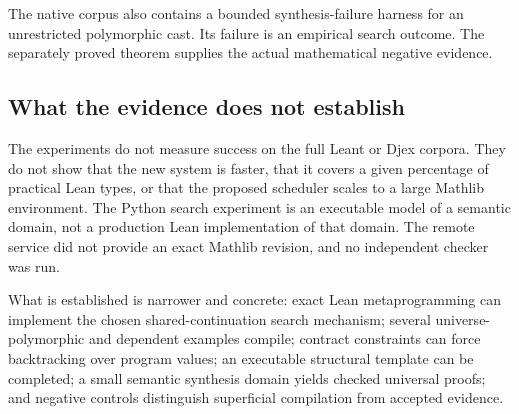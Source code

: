 The native corpus also contains a bounded synthesis-failure harness for an unrestricted polymorphic cast. Its failure is an empirical search outcome. The separately proved  theorem supplies the actual mathematical negative evidence.

\subsection{What the evidence does not establish}
The experiments do not measure success on the full Leant or Djex corpora. They do not show that the new system is faster, that it covers a given percentage of practical Lean types, or that the proposed scheduler scales to a large Mathlib environment. The Python search experiment is an executable model of a semantic domain, not a production Lean implementation of that domain. The remote service did not provide an exact Mathlib revision, and no independent checker was run.

What is established is narrower and concrete: exact Lean metaprogramming can implement the chosen shared-continuation search mechanism; several universe-polymorphic and dependent examples compile; contract constraints can force backtracking over program values; an executable structural template can be completed; a small semantic synthesis domain yields checked universal proofs; and negative controls distinguish superficial compilation from accepted evidence.
